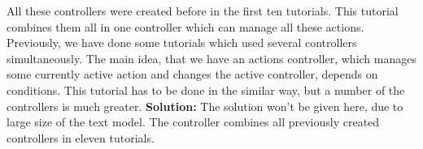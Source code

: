 All these controllers were created before in the first ten tutorials. This tutorial combines them all in one controller which can manage all these actions. Previously, we have done some tutorials which used several controllers simultaneously. The main idea, that we have an actions controller, which manages some currently active action and changes the active controller, depends on conditions. This tutorial has to be done in the similar way, but a number of the controllers is much greater. \newline \newline
\textbf{Solution:} \newline \newline
The solution won't be given here, due to large size of the text model. The controller combines all previously created controllers in eleven tutorials.
